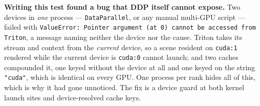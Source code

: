\documentclass{article}
\begin{document}
\textbf{Writing this test found a bug that DDP itself cannot expose.} Two
devices in \emph{one} process --- \texttt{DataParallel}, or any manual
multi-GPU script --- failed with \texttt{ValueError: Pointer argument (at 0)
cannot be accessed from Triton}, a message naming neither the device nor the
cause. Triton takes its stream and context from the \emph{current} device, so a
scene resident on \texttt{cuda:1} rendered while the current device is
\texttt{cuda:0} cannot launch; and two caches compounded it, one keyed without
the device at all and one keyed on the string \texttt{"cuda"}, which is
identical on every GPU. One process per rank hides all of this, which is why it
had gone unnoticed. The fix is a device guard at both kernel launch sites and
device-resolved cache keys.

\begin{table}[h]
\centering
\caption{Scaling the input pipeline. PushT at its native size, batch 128 per
rank, 400 steps, on one node. Nothing is shared between ranks, so the render
scales with them --- but the per-rank column is not monotone, and that is the
same host-bound effect Section~\ref{sec:coverage} reports rather than a
property of the pipeline: the 4-rank row was taken while the storage sweep had
the node's other CPUs. It is left in, because a table that only shows the runs
taken on a quiet node is measuring the queue.}
\label{tab:ddp}
\vskip 0.06in
\footnotesize

\end{table}
\end{document}
